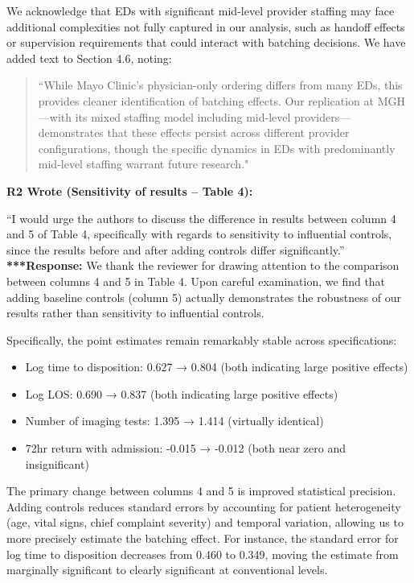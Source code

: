 \documentclass[11pt]{article}
\newenvironment{quote2}
{ \bigskip
\noindent
         \small\em
         \baselineskip=14pt
}
\newcommand{\1}{\hbox{\rm 1\kern-.35em 1}}
\begin{document}
{{{{We acknowledge that EDs with significant mid-level provider staffing may face additional complexities not fully captured in our analysis, such as handoff effects or supervision requirements that could interact with batching decisions. We have added text to Section 4.6, noting:

\begin{quote}
    ``While Mayo Clinic's physician-only ordering differs from many EDs, this provides cleaner identification of batching effects. Our replication at MGH—with its mixed staffing model including mid-level providers—demonstrates that these effects persist across different provider configurations, though the specific dynamics in EDs with predominantly mid-level staffing warrant future research."
\end{quote}

\color{black}


\begin{quote2}
\textbf{R2 Wrote (Sensitivity of results – Table 4):}  

\noindent``I would urge the authors to discuss the difference in results between column 4
and 5 of Table 4, specifically with regards to sensitivity to influential controls, since the
results before and after adding controls differ significantly.” 
\end{quote2}

\noindent\textbf{***Response:} \color{blue}
We thank the reviewer for drawing attention to the comparison between columns 4 and 5 in Table 4. Upon careful examination, we find that adding baseline controls (column 5) actually demonstrates the robustness of our results rather than sensitivity to influential controls.

Specifically, the point estimates remain remarkably stable across specifications:
\begin{itemize}
    \item Log time to disposition: 0.627 → 0.804 (both indicating large positive effects)
    \item Log LOS: 0.690 → 0.837 (both indicating large positive effects)  
    \item Number of imaging tests: 1.395 → 1.414 (virtually identical)
    \item 72hr return with admission: -0.015 → -0.012 (both near zero and insignificant)
\end{itemize}

The primary change between columns 4 and 5 is improved statistical precision. Adding controls reduces standard errors by accounting for patient heterogeneity (age, vital signs, chief complaint severity) and temporal variation, allowing us to more precisely estimate the batching effect. For instance, the standard error for log time to disposition decreases from 0.460 to 0.349, moving the estimate from marginally significant to clearly significant at conventional levels.

}}}}
\end{document}
